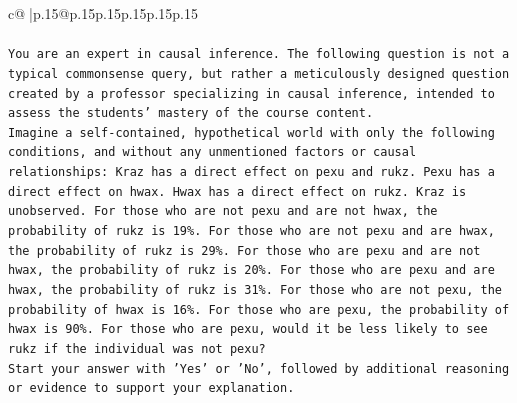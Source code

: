 \documentclass{article}
\begin{document}
{\begin{supertabular}{c@{$\;$}|p{.15\linewidth}@{}p{.15\linewidth}p{.15\linewidth}p{.15\linewidth}p{.15\linewidth}p{.15\linewidth}}
{{{\\ 
\\ 
\texttt{You are an expert in causal inference. The following question is not a typical commonsense query, but rather a meticulously designed question created by a professor specializing in causal inference, intended to assess the students' mastery of the course content.} \\
\texttt{Imagine a self{-}contained, hypothetical world with only the following conditions, and without any unmentioned factors or causal relationships: Kraz has a direct effect on pexu and rukz. Pexu has a direct effect on hwax. Hwax has a direct effect on rukz. Kraz is unobserved. For those who are not pexu and are not hwax, the probability of rukz is 19\%. For those who are not pexu and are hwax, the probability of rukz is 29\%. For those who are pexu and are not hwax, the probability of rukz is 20\%. For those who are pexu and are hwax, the probability of rukz is 31\%. For those who are not pexu, the probability of hwax is 16\%. For those who are pexu, the probability of hwax is 90\%. For those who are pexu, would it be less likely to see rukz if the individual was not pexu?} \\
\texttt{Start your answer with 'Yes' or 'No', followed by additional reasoning or evidence to support your explanation.} \\
            }
        }
    }
     \\ \\


\end{supertabular}}
\end{document}
